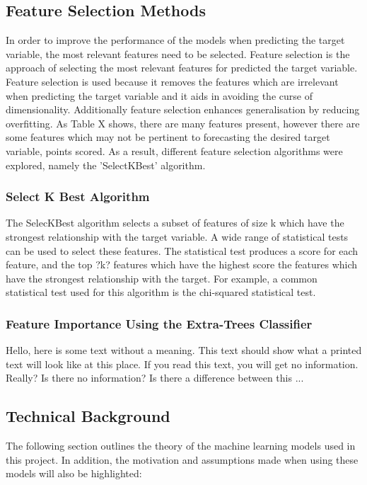 \documentclass[a4paper,11pt,twoside]{article}
\begin{document}
\subsection{Feature Selection Methods}
In order to improve the performance of the models when predicting the target variable, the most relevant features need to be selected. Feature selection is the approach of selecting the most relevant features for predicted the target variable. Feature selection is used because it removes the features which are irrelevant when predicting the target variable and it aids in avoiding the curse of dimensionality. Additionally feature selection enhances generalisation by reducing overfitting. As Table X shows, there are many features present, however there are some features which may not be pertinent to forecasting the desired target variable, points scored. As a result, different feature selection algorithms were explored, namely the 'SelectKBest' algorithm.


\subsubsection{Select K Best Algorithm}
The SelecKBest algorithm selects a subset of features of size k which have the strongest relationship with the target variable. A wide range of statistical tests can be used to select these features. The statistical test produces a score for each feature, and the top ?k? features which have the highest score the features which have the strongest relationship with the target. For example, a common statistical test used for this algorithm is the chi-squared statistical test.  

 \subsubsection{Feature Importance Using the Extra-Trees Classifier}
 Hello,  here  is  some  text  without  a  meaning.   This  
text  should  show  what  a printed text will look like at 
this place.  If you read this text, you will get no information.  
Really?  Is there no information?  Is there a difference between 
this ... 


\subsection{Technical Background}
 
The following section outlines the theory of the machine learning models used in this project. In addition, the motivation and assumptions made when using these models will also be highlighted:
\end{document}
